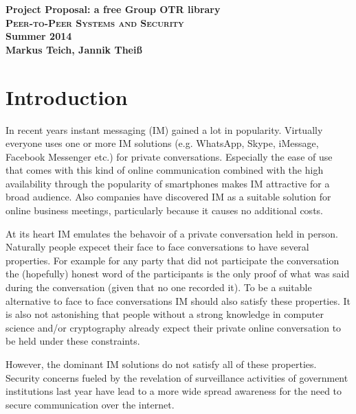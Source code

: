

\title{}
\author{Markus Teich, Jannik Theiß}
\date{\today}



\begin{center}
\huge \textbf{Project Proposal: a free Group OTR library} \\
\vspace{2cm}
\LARGE\textbf{\textsc{Peer-to-Peer Systems and Security}}\\
\vspace{0.5cm}
\textbf{Summer 2014}\\
\textbf{Markus Teich, Jannik Theiß}
\vspace{3.5cm}
\end{center}


\section{Introduction}
In recent years instant messaging (IM) gained a lot in popularity. Virtually everyone uses one or more IM solutions (e.g. WhatsApp, Skype, iMessage, Facebook Messenger etc.) for private conversations. Especially the ease of use that comes with this kind of online communication combined with the high availability through the popularity of smartphones makes IM attractive for a broad audience. Also companies have discovered IM as a suitable solution for online business meetings, particularly because it causes no additional costs.

At its heart IM emulates the behavoir of a private conversation held in person. Naturally people expecet their face to face conversations to have several properties. For example for any party that did not participate the conversation the (hopefully) honest word of the participants is the only proof of what was said during the conversation (given that no one recorded it). To be a suitable alternative to face to face conversations IM should also satisfy these properties. It is also not astonishing that people without a strong knowledge in computer science and/or cryptography already expect their private online conversation to be held under these constraints.


However, the dominant IM solutions do not satisfy all of these properties. Security concerns fueled by the revelation of surveillance activities of government institutions last year have lead to a more wide spread awareness for the need to secure communication over the internet.


